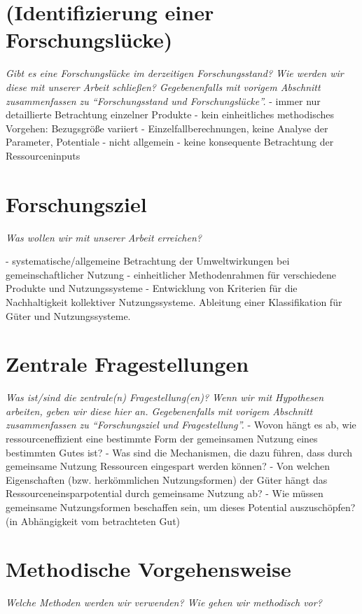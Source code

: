 \documentclass[11pt, titlepage=true]{scrartcl} %
\newcommand{\was}[1]{\small\textit{#1}}
\begin{document}
\section{(Identifizierung einer Forschungslücke)}
 \was{Gibt es eine Forschungslücke im derzeitigen Forschungsstand? Wie werden wir
 diese mit unserer Arbeit schließen?
 Gegebenenfalls mit vorigem Abschnitt zusammenfassen zu \enquote{Forschungsstand und Forschungslücke}.}
 - immer nur detaillierte Betrachtung einzelner Produkte
 - kein einheitliches methodisches Vorgehen: Bezugsgröße variiert
 - Einzelfallberechnungen, keine Analyse der Parameter, Potentiale
 - nicht allgemein
 - keine konsequente Betrachtung der Ressourceninputs
 
 
\section{Forschungsziel}
\was{Was wollen wir mit unserer Arbeit erreichen?}

- systematische/allgemeine Betrachtung der Umweltwirkungen bei gemeinschaftlicher Nutzung
- einheitlicher Methodenrahmen für verschiedene Produkte und Nutzungssysteme
- Entwicklung von Kriterien für die Nachhaltigkeit kollektiver Nutzungssysteme. Ableitung einer Klassifikation für Güter und Nutzungssysteme.

\section{Zentrale Fragestellungen}
\was{Was ist/sind die zentrale(n) Fragestellung(en)? Wenn wir mit Hypothesen
arbeiten, geben wir diese hier an.
Gegebenenfalls mit vorigem Abschnitt zusammenfassen zu "`Forschungsziel
und Fragestellung"'.}
- Wovon hängt es ab, wie ressourceneffizient eine bestimmte Form der gemeinsamen Nutzung eines bestimmten Gutes ist?
	- Was sind die Mechanismen, die dazu führen, dass durch gemeinsame Nutzung Ressourcen eingespart werden können?
	- Von welchen Eigenschaften (bzw. herkömmlichen Nutzungsformen) der Güter hängt das Ressourceneinsparpotential durch gemeinsame Nutzung ab?
	- Wie müssen gemeinsame Nutzungsformen beschaffen sein, um dieses Potential auszuschöpfen? (in Abhängigkeit vom betrachteten Gut)

\section{Methodische Vorgehensweise}
\was{Welche Methoden werden wir verwenden? Wie gehen wir methodisch vor?}
\end{document}

